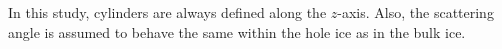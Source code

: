 In this study, cylinders are always defined along the $z$-axis. Also, the scattering angle is assumed to behave the same within the hole ice as in the bulk ice.

